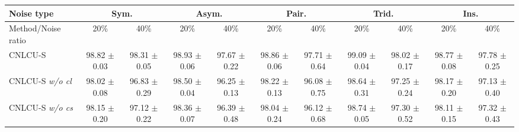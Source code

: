 \documentclass[11pt]{article}
\begin{document}
\begin{table}[!htbp]
    \small
\centering
	\begin{tabular}{l |cc|cc|cc|cc|cc} 
		\Xhline{3\arrayrulewidth}	 	
		   Noise type &\multicolumn{2}{c|}{Sym.}&\multicolumn{2}{c|}{Asym.}&\multicolumn{2}{c|}{Pair.}&\multicolumn{2}{c|}{Trid.}&\multicolumn{2}{c}{Ins.}\\
			\hline
		   Method/Noise ratio&  20\% & 40\%& 20\% & 40\% &20\% & 40\%& 20\% & 40\% & 20\% & 40\%\\
			\hline
			CNLCU-S & \makecell{98.82\\ $\pm$\scriptsize{0.03}} & \makecell{98.31\\ $\pm$\scriptsize{0.05}} & \makecell{98.93\\ $\pm$\scriptsize{0.06}}& \makecell{97.67\\ $\pm$\scriptsize{0.22}} & \makecell{98.86\\ $\pm$\scriptsize{0.06}} & \makecell{97.71\\ $\pm$\scriptsize{0.64}} &  \makecell{99.09\\ $\pm$\scriptsize{0.04}}	& \makecell{98.02\\ $\pm$\scriptsize{0.17}} & \makecell{98.77\\ $\pm$\scriptsize{0.08}} & \makecell{97.78\\ $\pm$\scriptsize{0.25}}\\	  
			\hline
			CNLCU-S \textit{w/o cl} & \makecell{98.02\\ $\pm$\scriptsize{0.08}} & \makecell{96.83\\ $\pm$\scriptsize{0.29}} & \makecell{98.50\\ $\pm$\scriptsize{0.04}} & \makecell{96.25\\ $\pm$\scriptsize{0.13}} & \makecell{98.22\\ $\pm$\scriptsize{0.13}} & \makecell{96.08\\ $\pm$\scriptsize{0.75}} & \makecell{98.64\\ $\pm$\scriptsize{0.31}} & \makecell{97.25\\ $\pm$\scriptsize{0.24}} & \makecell{98.17\\ $\pm$\scriptsize{0.20}} & \makecell{97.13\\ $\pm$\scriptsize{0.40}}\\	  
			\hline
			CNLCU-S \textit{w/o cs}& \makecell{98.15\\ $\pm$\scriptsize{0.20}} & \makecell{97.12\\ $\pm$\scriptsize{0.22}} & \makecell{98.36\\ $\pm$\scriptsize{0.07}} & \makecell{96.39\\ $\pm$\scriptsize{0.48}} & \makecell{98.04\\ $\pm$\scriptsize{0.24}} & \makecell{96.12\\ $\pm$\scriptsize{0.68}} & \makecell{98.74\\ $\pm$\scriptsize{0.05}} & \makecell{97.30\\ $\pm$\scriptsize{0.52}} & \makecell{98.11\\ $\pm$\scriptsize{0.15}} & \makecell{97.32\\ $\pm$\scriptsize{0.43}}  \\	  

\end{tabular}
\end{table}
\end{document}
